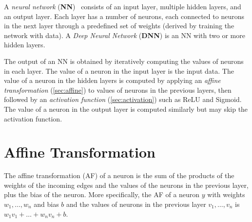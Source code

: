 \documentclass[oneside,11pt,dvipsnames]{book}
\begin{document}
A \emph{neural network} (\textbf{NN})~\cite{Goodfellow-et-al-2016} consists of an input layer, multiple hidden layers, and an output layer. Each layer has a number of neurons, each connected to neurons in the next layer through a predefined set of weights (derived by training the network with data). A \emph{Deep Neural Network} (\textbf{DNN}) is an NN with two or more hidden layers. 


The output of an NN is obtained by iteratively computing  the  values  of  neurons  in  each  layer.
The value of a neuron in the input layer is the input data. The value of a neuron in the hidden layers is computed by applying an \emph{affine transformation} (\autoref{sec:affine}) to values of neurons in the previous layers, then followed by an \emph{activation function} (\autoref{sec:activation}) such as ReLU and Sigmoid. The value of a neuron in the output layer is computed similarly but may skip the activation function.



\section{Affine Transformation}\label{sec:affine}
The affine transformation (AF) of a neuron is the sum of the products of the weights of the incoming edges and the values of the neurons in the previous layer, plus the bias of the neuron.
More specifically, the AF of a neuron \(y\) with weights \(w_1, \dots, w_n\) and bias \(b\) and the values of neurons in the previous layer \(v_1, \dots, v_n\) is \(w_1v_1 + \dots + w_nv_n + b\). 
\end{document}
